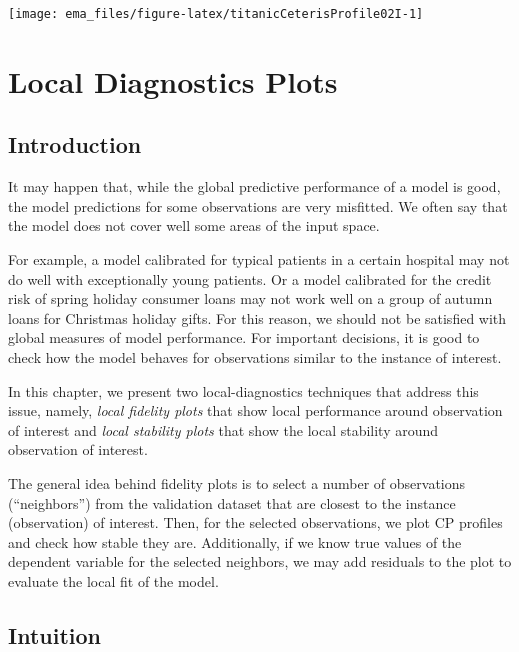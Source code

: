 \documentclass[]{krantz}
\begin{document}
\begin{center}\texttt{[image: ema\_files/figure-latex/titanicCeterisProfile02I-1]} \end{center}

\hypertarget{localDiagnostics}{%
\chapter{Local Diagnostics Plots}\label{localDiagnostics}}

\hypertarget{cPLocDiagIntro}{%
\section{Introduction}\label{cPLocDiagIntro}}

It may happen that, while the global predictive performance of a model is good, the model predictions for some observations are very misfitted. We often say that the model does not cover well some areas of the input space.

For example, a model calibrated for typical patients in a certain hospital may not do well with exceptionally young patients. Or a model calibrated for the credit risk of spring holiday consumer loans may not work well on a group of autumn loans for Christmas holiday gifts.
For this reason, we should not be satisfied with global measures of model performance. For important decisions, it is good to check how the model behaves for observations similar to the instance of interest.

In this chapter, we present two local-diagnostics techniques that address this issue, namely, \emph{local fidelity plots} that show local performance around observation of interest and \emph{local stability plots} that show the local stability around observation of interest.

The general idea behind fidelity plots is to select a number of observations (``neighbors'') from the validation dataset that are closest to the instance (observation) of interest. Then, for the selected observations, we plot CP profiles and check how stable they are. Additionally, if we know true values of the dependent variable for the selected neighbors, we may add residuals to the plot to evaluate the local fit of the model.

\hypertarget{cPLocDiagIntuition}{%
\section{Intuition}\label{cPLocDiagIntuition}}
\end{document}
